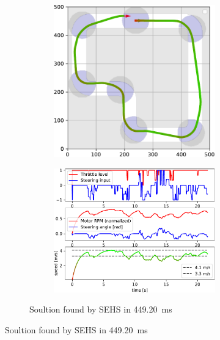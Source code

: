 \begin{figure}[!tbp]
	\vspace{0.75cm}
	
	\begin{subfigure}[t]{\textwidth}
		\begin{subfigure}[c]{0.49\textwidth}
			\includegraphics[width=\textwidth]{../img/experiments/simple_sehs_trajectory}
		\end{subfigure}
		\hfill
		\begin{subfigure}[c]{0.49\textwidth}
			\includegraphics[width=\textwidth]{../img/experiments/simple_sehs_actuators}
		\end{subfigure}
		\caption{Soultion found by SEHS in \SI{449.20}{\milli\second}}
		\label{fig:simple-sehs}
	\end{subfigure}
	

\end{figure}
